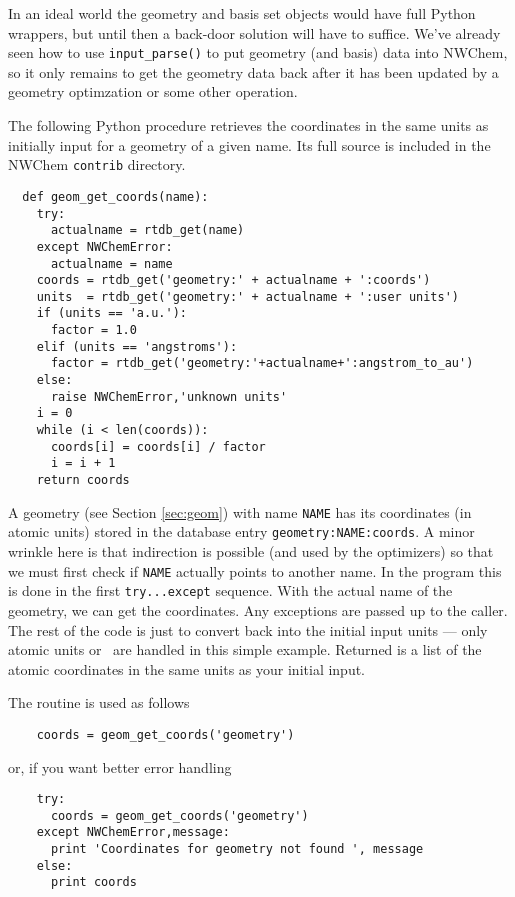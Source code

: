 In an ideal world the geometry and basis set objects would have full
Python wrappers, but until then a back-door solution will have to
suffice.  We've already seen how to use \verb+input_parse()+ to put
geometry (and basis) data into NWChem, so it only remains to get the
geometry data back after it has been updated by a geometry optimzation
or some other operation.  

The following Python procedure retrieves the coordinates in the
same units as initially input for a geometry of a given name.
Its full source is included in the NWChem \verb+contrib+ directory.
\begin{verbatim}
  def geom_get_coords(name):
    try:
      actualname = rtdb_get(name)
    except NWChemError:
      actualname = name
    coords = rtdb_get('geometry:' + actualname + ':coords')
    units  = rtdb_get('geometry:' + actualname + ':user units')
    if (units == 'a.u.'):
      factor = 1.0
    elif (units == 'angstroms'):
      factor = rtdb_get('geometry:'+actualname+':angstrom_to_au')
    else:
      raise NWChemError,'unknown units'
    i = 0
    while (i < len(coords)):
      coords[i] = coords[i] / factor
      i = i + 1
    return coords
\end{verbatim}

A geometry (see Section \ref{sec:geom}) with name \verb+NAME+ has its
coordinates (in atomic units) stored in the database entry
\verb+geometry:NAME:coords+.  A minor wrinkle here is that 
indirection is possible (and used by the optimizers) so that we must
first check if \verb+NAME+ actually points to another name.  In the
program this is done in the first \verb+try...except+ sequence.  With
the actual name of the geometry, we can get the coordinates.  Any
exceptions are passed up to the caller.  The rest of the code is just
to convert back into the initial input units --- only atomic units 
or \angstroms\ are handled in this simple example.  Returned 
is a list of the atomic coordinates in the same units as your
initial input.

The routine is used as follows
\begin{verbatim}
    coords = geom_get_coords('geometry')
\end{verbatim}
or, if you want better error handling 
\begin{verbatim}
    try:
      coords = geom_get_coords('geometry')
    except NWChemError,message:
      print 'Coordinates for geometry not found ', message
    else:
      print coords    
\end{verbatim}

